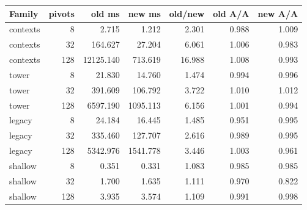 \begin{center}\small
\begin{tabular}{@{}lrrrrrr@{}}
\toprule
Family & pivots & old ms & new ms & old/new & old A/A & new A/A \\
\midrule
contexts & 8 & 2.715 & 1.212 & 2.301 & 0.988 & 1.009 \\
contexts & 32 & 164.627 & 27.204 & 6.061 & 1.006 & 0.983 \\
contexts & 128 & 12125.140 & 713.619 & 16.988 & 1.008 & 0.993 \\
tower & 8 & 21.830 & 14.760 & 1.474 & 0.994 & 0.996 \\
tower & 32 & 391.609 & 106.792 & 3.722 & 1.010 & 1.012 \\
tower & 128 & 6597.190 & 1095.113 & 6.156 & 1.001 & 0.994 \\
legacy & 8 & 24.184 & 16.445 & 1.485 & 0.951 & 0.995 \\
legacy & 32 & 335.460 & 127.707 & 2.616 & 0.989 & 0.995 \\
legacy & 128 & 5342.976 & 1541.778 & 3.446 & 1.003 & 0.961 \\
shallow & 8 & 0.351 & 0.331 & 1.083 & 0.985 & 0.985 \\
shallow & 32 & 1.700 & 1.635 & 1.111 & 0.970 & 0.822 \\
shallow & 128 & 3.935 & 3.574 & 1.109 & 0.991 & 0.998 \\
\bottomrule
\end{tabular}
\end{center}
